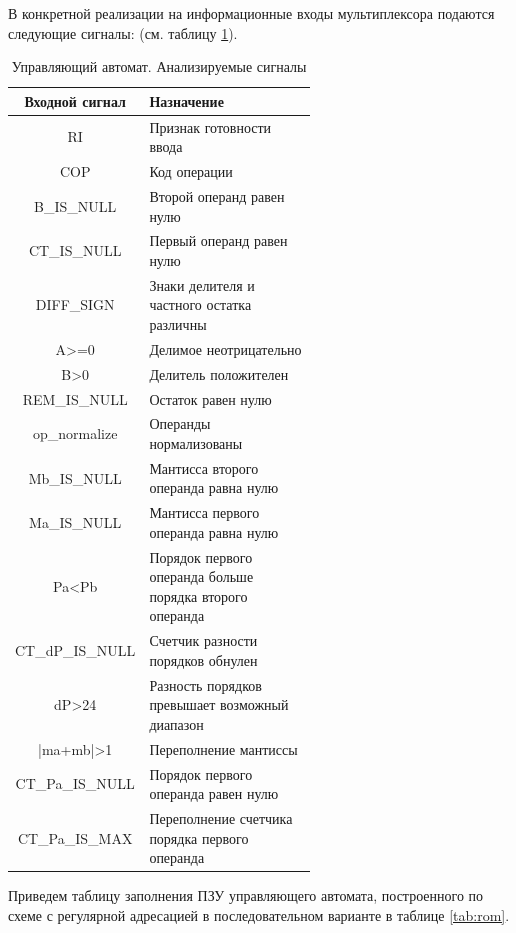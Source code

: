 \documentclass[a4paper,14pt]{extarticle}
\begin{document}
В конкретной реализации на информационные входы мультиплексора подаются следующие сигналы: (см. таблицу \ref{tab:signalsma}).
\hypertarget{name}{}
\begin{table}[h!]
	\centering
	\small
	\begin{tabular}{|c||m{0.6\linewidth}|}
		\hline
		\textbf{Входной сигнал} & \textbf{Назначение} \\ \hline \hline
		RI & Признак готовности ввода \\ \hline
		COP & Код операции  \\ \hline
		B\_IS\_NULL & Второй операнд равен нулю \\ \hline
		CT\_IS\_NULL & Первый операнд равен нулю \\ \hline
		DIFF\_SIGN & Знаки делителя и частного остатка различны \\ \hline
		A>=0 & Делимое неотрицательно \\ \hline
		B>0 & Делитель положителен \\ \hline
		REM\_IS\_NULL & Остаток равен нулю \\ \hline
		op\_normalize & Операнды нормализованы \\ \hline
		Mb\_IS\_NULL & Мантисса второго операнда равна нулю \\ \hline
		Ma\_IS\_NULL & Мантисса первого операнда равна нулю \\ \hline
		Pa<Pb & Порядок первого операнда больше порядка второго операнда \\ \hline
		CT\_dP\_IS\_NULL & Счетчик разности порядков обнулен \\ \hline
		dP>24 & Разность порядков превышает возможный диапазон \\ \hline
		|ma+mb|>1 & Переполнение мантиссы \\ \hline
		CT\_Pa\_IS\_NULL & Порядок первого операнда равен нулю \\ \hline
		CT\_Pa\_IS\_MAX & Переполнение счетчика порядка первого операнда \\ \hline
	\end{tabular}
	\caption{Управляющий автомат. Анализируемые сигналы}
	\label{tab:signalsma}
\end{table}

Приведем таблицу заполнения ПЗУ управляющего автомата, построенного по схеме с регулярной адресацией в последовательном варианте в таблице \ref{tab:rom}.
\end{document}
